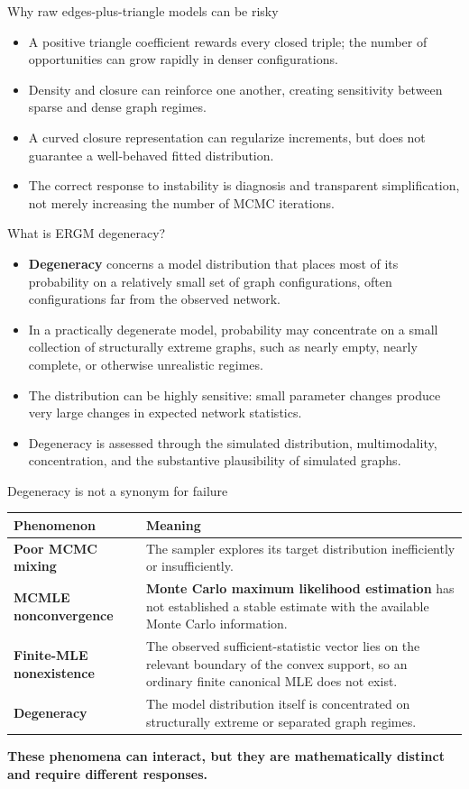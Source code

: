 \documentclass[aspectratio=169,11pt]{beamer}
\newcommand{\term}[1]{\textbf{\color{nupurple}#1}}
\begin{document}
\begin{frame}{Why raw edges-plus-triangle models can be risky}
\begin{itemize}
\item A positive triangle coefficient rewards every closed triple; the number of opportunities can grow rapidly in denser configurations.
\item Density and closure can reinforce one another, creating sensitivity between sparse and dense graph regimes.
\item A curved closure representation can regularize increments, but does not guarantee a well-behaved fitted distribution.
\item The correct response to instability is diagnosis and transparent simplification, not merely increasing the number of MCMC iterations.
\end{itemize}
\end{frame}

\begin{frame}{What is ERGM degeneracy?}
\begin{itemize}
\item \term{Degeneracy} concerns a model distribution that places most of its probability on a relatively small set of graph configurations, often configurations far from the observed network.
\item In a practically degenerate model, probability may concentrate on a small collection of structurally extreme graphs, such as nearly empty, nearly complete, or otherwise unrealistic regimes.
\item The distribution can be highly sensitive: small parameter changes produce very large changes in expected network statistics.
\item Degeneracy is assessed through the simulated distribution, multimodality, concentration, and the substantive plausibility of simulated graphs.
\end{itemize}
\end{frame}

\begin{frame}{Degeneracy is not a synonym for failure}
\begin{tabularx}{\textwidth}{>{\bfseries}lX}
\toprule
Phenomenon & Meaning\\
\midrule
Poor MCMC mixing & The sampler explores its target distribution inefficiently or insufficiently.\\
MCMLE nonconvergence & \term{Monte Carlo maximum likelihood estimation} has not established a stable estimate with the available Monte Carlo information.\\
Finite-MLE nonexistence & The observed sufficient-statistic vector lies on the relevant boundary of the convex support, so an ordinary finite canonical MLE does not exist.\\
Degeneracy & The model distribution itself is concentrated on structurally extreme or separated graph regimes.\\
\bottomrule
\end{tabularx}
\vspace{1ex}
\term{These phenomena can interact, but they are mathematically distinct and require different responses.}
\end{frame}
\end{document}
